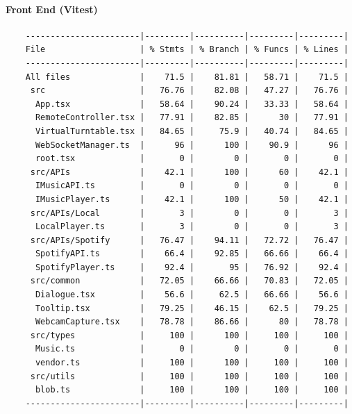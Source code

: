 \begin{uomappendix}
                \paragraph{Front End (Vitest)}
                \begin{verbatim}
    -----------------------|---------|----------|---------|---------|
    File                   | % Stmts | % Branch | % Funcs | % Lines |
    -----------------------|---------|----------|---------|---------|
    All files              |    71.5 |    81.81 |   58.71 |    71.5 |
     src                   |   76.76 |    82.08 |   47.27 |   76.76 |
      App.tsx              |   58.64 |    90.24 |   33.33 |   58.64 |
      RemoteController.tsx |   77.91 |    82.85 |      30 |   77.91 |
      VirtualTurntable.tsx |   84.65 |     75.9 |   40.74 |   84.65 |
      WebSocketManager.ts  |      96 |      100 |    90.9 |      96 |
      root.tsx             |       0 |        0 |       0 |       0 |
     src/APIs              |    42.1 |      100 |      60 |    42.1 |
      IMusicAPI.ts         |       0 |        0 |       0 |       0 |
      IMusicPlayer.ts      |    42.1 |      100 |      50 |    42.1 |
     src/APIs/Local        |       3 |        0 |       0 |       3 |
      LocalPlayer.ts       |       3 |        0 |       0 |       3 |
     src/APIs/Spotify      |   76.47 |    94.11 |   72.72 |   76.47 |
      SpotifyAPI.ts        |    66.4 |    92.85 |   66.66 |    66.4 |
      SpotifyPlayer.ts     |    92.4 |       95 |   76.92 |    92.4 |
     src/common            |   72.05 |    66.66 |   70.83 |   72.05 |
      Dialogue.tsx         |    56.6 |     62.5 |   66.66 |    56.6 |
      Tooltip.tsx          |   79.25 |    46.15 |    62.5 |   79.25 |
      WebcamCapture.tsx    |   78.78 |    86.66 |      80 |   78.78 |
     src/types             |     100 |      100 |     100 |     100 |
      Music.ts             |       0 |        0 |       0 |       0 |
      vendor.ts            |     100 |      100 |     100 |     100 |
     src/utils             |     100 |      100 |     100 |     100 |
      blob.ts              |     100 |      100 |     100 |     100 |
    -----------------------|---------|----------|---------|---------|
                \end{verbatim}
    

\end{uomappendix}
